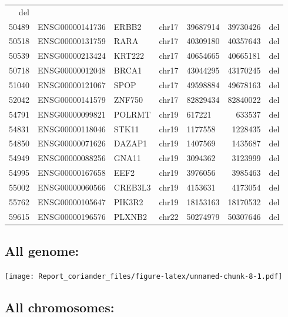 \documentclass[]{article}
\begin{document}
\begin{longtable}[]{@{}rrlrlrl@{}}
del\tabularnewline
50489 & ENSG00000141736 & ERBB2 & chr17 & 39687914 & 39730426 &
del\tabularnewline
50518 & ENSG00000131759 & RARA & chr17 & 40309180 & 40357643 &
del\tabularnewline
50539 & ENSG00000213424 & KRT222 & chr17 & 40654665 & 40665181 &
del\tabularnewline
50718 & ENSG00000012048 & BRCA1 & chr17 & 43044295 & 43170245 &
del\tabularnewline
51040 & ENSG00000121067 & SPOP & chr17 & 49598884 & 49678163 &
del\tabularnewline
52042 & ENSG00000141579 & ZNF750 & chr17 & 82829434 & 82840022 &
del\tabularnewline
54791 & ENSG00000099821 & POLRMT & chr19 & 617221 & 633537 &
del\tabularnewline
54831 & ENSG00000118046 & STK11 & chr19 & 1177558 & 1228435 &
del\tabularnewline
54850 & ENSG00000071626 & DAZAP1 & chr19 & 1407569 & 1435687 &
del\tabularnewline
54949 & ENSG00000088256 & GNA11 & chr19 & 3094362 & 3123999 &
del\tabularnewline
54995 & ENSG00000167658 & EEF2 & chr19 & 3976056 & 3985463 &
del\tabularnewline
55002 & ENSG00000060566 & CREB3L3 & chr19 & 4153631 & 4173054 &
del\tabularnewline
55762 & ENSG00000105647 & PIK3R2 & chr19 & 18153163 & 18170532 &
del\tabularnewline
59615 & ENSG00000196576 & PLXNB2 & chr22 & 50274979 & 50307646 &
del\tabularnewline
\bottomrule
\end{longtable}

\hypertarget{all-genome}{%
\subsection{All genome:}\label{all-genome}}

\texttt{[image: Report\_coriander\_files/figure-latex/unnamed-chunk-8-1.pdf]}

\hypertarget{all-chromosomes}{%
\subsection{All chromosomes:}\label{all-chromosomes}}
\end{document}
